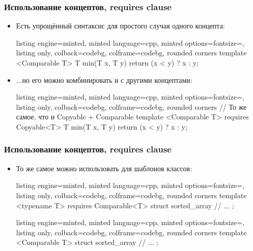 \documentclass[10pt]{beamer}
\begin{document}
\begin{frame}[fragile]
\frametitle{Использование концептов, requires clause}
\begin{itemize}
\item Есть упрощённый синтаксис для простого случая одного концепта:
\begin{tcblisting}{listing engine=minted, minted language=cpp, minted options={fontsize=\scriptsize}, listing only, colback=codebg, colframe=codebg, rounded corners}
template <Comparable T>
T min(T x, T y) {
  return (x < y) ? x : y;
}
\end{tcblisting}
\pause
\item ...но его можно комбинировать и с другими концептами:
\begin{tcblisting}{listing engine=minted, minted language=cpp, minted options={fontsize=\scriptsize}, listing only, colback=codebg, colframe=codebg, rounded corners}
// То же самое, что и Copyable + Comparable
template <Comparable T>
requires Copyable<T>
T min(T x, T y) {
  return (x < y) ? x : y;
}
\end{tcblisting}
\end{itemize}
\end{frame}

\begin{frame}[fragile]
\frametitle{Использование концептов, requires clause}
\begin{itemize}
\item То же самое можно использовать для шаблонов классов:
\begin{tcblisting}{listing engine=minted, minted language=cpp, minted options={fontsize=\scriptsize}, listing only, colback=codebg, colframe=codebg, rounded corners}
template <typename T>
requires Comparable<T>
struct sorted_array {
  // ...
};
\end{tcblisting}
\pause
\begin{tcblisting}{listing engine=minted, minted language=cpp, minted options={fontsize=\scriptsize}, listing only, colback=codebg, colframe=codebg, rounded corners}
template <Comparable T>
struct sorted_array {
  // ...
};
\end{tcblisting}
\end{itemize}
\end{frame}
\end{document}
